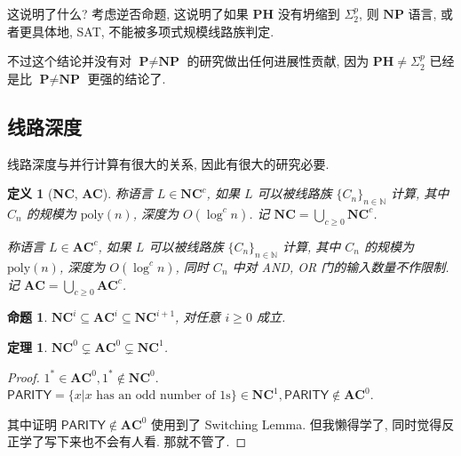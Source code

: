 \documentclass[8pt]{article}
\theoremstyle{compact}
\newtheorem{theorem}{定理}[section]
\newtheorem{definition}{定义}[section]
\newtheorem{proposition}{命题}[section]
\def\ge{\geqslant}
\def\P{\textbf{P}}
\def\NP{\textbf{NP}}
\def\PH{\textbf{PH}}
\def\NC{\textbf{NC}}
\def\AC{\textbf{AC}}
\begin{document}
这说明了什么? 考虑逆否命题, 这说明了如果 $\PH$ 没有坍缩到 $\Sigma_2^p$, 则 $\NP$ 语言, 或者更具体地, \textsf{SAT}, 不能被多项式规模线路族判定.

不过这个结论并没有对 $\P \neq \NP$ 的研究做出任何进展性贡献, 因为 $\PH \neq \Sigma_2^p$ 已经是比 $\P \neq \NP$ 更强的结论了.

\subsection{线路深度}
线路深度与并行计算有很大的关系, 因此有很大的研究必要.
\begin{definition}[\NC, \AC]
	称语言 $L \in \NC^c$, 如果 $L$ 可以被线路族 $\{C_n\}_{n \in \mathbb N}$ 计算, 其中 $C_n$ 的规模为 $\text{poly}(n)$, 深度为 $O(\log^cn)$. 记 $\NC = \bigcup_{c \ge 0} \NC^c$.

	称语言 $L \in \AC^c$, 如果 $L$ 可以被线路族 $\{C_n\}_{n \in \mathbb N}$ 计算, 其中 $C_n$ 的规模为 $\text{poly}(n)$, 深度为 $O(\log^cn)$, 同时 $C_n$ 中对 AND, OR 门的输入数量不作限制. 记 $\AC = \bigcup_{c \ge 0} \AC^c$.
\end{definition}
\begin{proposition}
	$\NC^i \subseteq \AC^i \subseteq \NC^{i + 1}$, 对任意 $i \ge 0$ 成立.
\end{proposition}
\begin{theorem}
	$\NC^0 \subsetneq \AC^0 \subsetneq \NC^1$.
\end{theorem}
\begin{proof}
	$1^* \in \AC^0, 1^* \notin \NC^0$.
	$\textsf{PARITY} = \{x | x \text{ has an odd number of 1s}\} \in \NC^1, \textsf{PARITY} \notin \AC^0$. 

	其中证明 $\textsf{PARITY} \notin \AC^0$ 使用到了 Switching Lemma. 但我懒得学了, 同时觉得反正学了写下来也不会有人看. 那就不管了.
\end{proof}

\newpage
\end{document}
